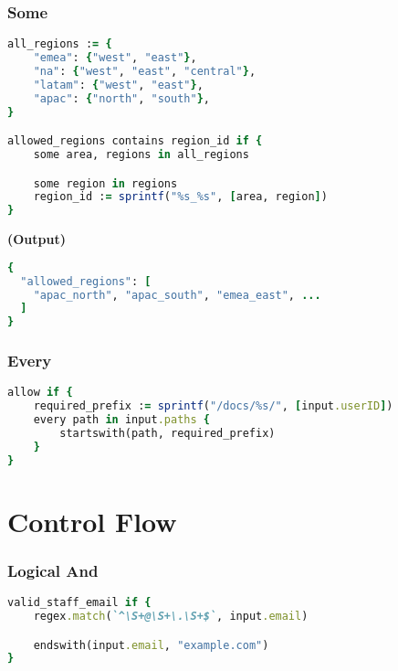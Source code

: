 \documentclass[twocolumn]{article}
\begin{document}
\vspace{-1em}
\subsubsection*{Some}

\begin{lstlisting}[language=Ruby]
all_regions := {
	"emea": {"west", "east"},
	"na": {"west", "east", "central"},
	"latam": {"west", "east"},
	"apac": {"north", "south"},
}

allowed_regions contains region_id if {
	some area, regions in all_regions

	some region in regions
	region_id := sprintf("%s_%s", [area, region])
}
\end{lstlisting}



\textbf{\tiny{(Output)}}
\begin{lstlisting}[language=Ruby]
{
  "allowed_regions": [
    "apac_north", "apac_south", "emea_east", ...
  ]
}
\end{lstlisting}



\vspace{-1em}
\subsubsection*{Every}

\begin{lstlisting}[language=Ruby]
allow if {
	required_prefix := sprintf("/docs/%s/", [input.userID])
	every path in input.paths {
		startswith(path, required_prefix)
	}
}
\end{lstlisting}






\section*{Control Flow}




\vspace{-1em}
\subsubsection*{Logical And}

\begin{lstlisting}[language=Ruby]
valid_staff_email if {
	regex.match(`^\S+@\S+\.\S+$`, input.email)

	endswith(input.email, "example.com")
}
\end{lstlisting}
\end{document}
